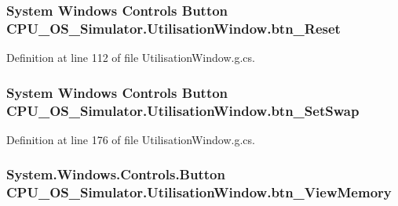 \subsubsection[{btn\+\_\+\+Reset}]{\setlength{\rightskip}{0pt plus 5cm}System Windows Controls Button C\+P\+U\+\_\+\+O\+S\+\_\+\+Simulator.\+Utilisation\+Window.\+btn\+\_\+\+Reset\hspace{0.3cm}{\ttfamily [package]}}\label{class_c_p_u___o_s___simulator_1_1_utilisation_window_a16d001bbb7b42530a56397f3339e3704}


Definition at line 112 of file Utilisation\+Window.\+g.\+cs.

\hypertarget{class_c_p_u___o_s___simulator_1_1_utilisation_window_aa30361a85b16eec362b962731232111a}{}
\subsubsection[{btn\+\_\+\+Set\+Swap}]{\setlength{\rightskip}{0pt plus 5cm}System Windows Controls Button C\+P\+U\+\_\+\+O\+S\+\_\+\+Simulator.\+Utilisation\+Window.\+btn\+\_\+\+Set\+Swap\hspace{0.3cm}{\ttfamily [package]}}\label{class_c_p_u___o_s___simulator_1_1_utilisation_window_aa30361a85b16eec362b962731232111a}


Definition at line 176 of file Utilisation\+Window.\+g.\+cs.

\hypertarget{class_c_p_u___o_s___simulator_1_1_utilisation_window_ada6c7de17fffd9b2323bb932a8250197}{}
\subsubsection[{btn\+\_\+\+View\+Memory}]{\setlength{\rightskip}{0pt plus 5cm}System.\+Windows.\+Controls.\+Button C\+P\+U\+\_\+\+O\+S\+\_\+\+Simulator.\+Utilisation\+Window.\+btn\+\_\+\+View\+Memory\hspace{0.3cm}{\ttfamily [package]}}\label{class_c_p_u___o_s___simulator_1_1_utilisation_window_ada6c7de17fffd9b2323bb932a8250197}


